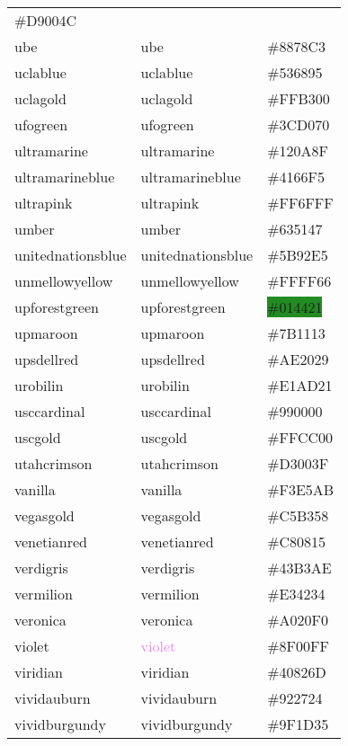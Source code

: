 \documentclass[
]{article}
\begin{document}
\begin{longtable}[]{@{}lll@{}}
\colorbox{uared}{\#D9004C}\tabularnewline
ube & \textcolor{ube}{ube} & \colorbox{ube}{\#8878C3}\tabularnewline
uclablue & \textcolor{uclablue}{uclablue} &
\colorbox{uclablue}{\#536895}\tabularnewline
uclagold & \textcolor{uclagold}{uclagold} &
\colorbox{uclagold}{\#FFB300}\tabularnewline
ufogreen & \textcolor{ufogreen}{ufogreen} &
\colorbox{ufogreen}{\#3CD070}\tabularnewline
ultramarine & \textcolor{ultramarine}{ultramarine} &
\colorbox{ultramarine}{\#120A8F}\tabularnewline
ultramarineblue & \textcolor{ultramarineblue}{ultramarineblue} &
\colorbox{ultramarineblue}{\#4166F5}\tabularnewline
ultrapink & \textcolor{ultrapink}{ultrapink} &
\colorbox{ultrapink}{\#FF6FFF}\tabularnewline
umber & \textcolor{umber}{umber} &
\colorbox{umber}{\#635147}\tabularnewline
unitednationsblue & \textcolor{unitednationsblue}{unitednationsblue} &
\colorbox{unitednationsblue}{\#5B92E5}\tabularnewline
unmellowyellow & \textcolor{unmellowyellow}{unmellowyellow} &
\colorbox{unmellowyellow}{\#FFFF66}\tabularnewline
upforestgreen & \textcolor{upforestgreen}{upforestgreen} &
\colorbox{forestgreen}{\#014421}\tabularnewline
upmaroon & \textcolor{upmaroon}{upmaroon} &
\colorbox{upmaroon}{\#7B1113}\tabularnewline
upsdellred & \textcolor{upsdellred}{upsdellred} &
\colorbox{upsdellred}{\#AE2029}\tabularnewline
urobilin & \textcolor{urobilin}{urobilin} &
\colorbox{urobilin}{\#E1AD21}\tabularnewline
usccardinal & \textcolor{usccardinal}{usccardinal} &
\colorbox{oucrimsonred}{\#990000}\tabularnewline
uscgold & \textcolor{uscgold}{uscgold} &
\colorbox{tangerineyellow}{\#FFCC00}\tabularnewline
utahcrimson & \textcolor{utahcrimson}{utahcrimson} &
\colorbox{utahcrimson}{\#D3003F}\tabularnewline
vanilla & \textcolor{vanilla}{vanilla} &
\colorbox{mediumchampagne}{\#F3E5AB}\tabularnewline
vegasgold & \textcolor{vegasgold}{vegasgold} &
\colorbox{vegasgold}{\#C5B358}\tabularnewline
venetianred & \textcolor{venetianred}{venetianred} &
\colorbox{venetianred}{\#C80815}\tabularnewline
verdigris & \textcolor{verdigris}{verdigris} &
\colorbox{verdigris}{\#43B3AE}\tabularnewline
vermilion & \textcolor{vermilion}{vermilion} &
\colorbox{cinnabar}{\#E34234}\tabularnewline
veronica & \textcolor{veronica}{veronica} &
\colorbox{veronica}{\#A020F0}\tabularnewline
violet & \textcolor{violet}{violet} &
\colorbox{electricviolet}{\#8F00FF}\tabularnewline
viridian & \textcolor{viridian}{viridian} &
\colorbox{viridian}{\#40826D}\tabularnewline
vividauburn & \textcolor{vividauburn}{vividauburn} &
\colorbox{vividauburn}{\#922724}\tabularnewline
vividburgundy & \textcolor{vividburgundy}{vividburgundy} &
\colorbox{vividburgundy}{\#9F1D35}\tabularnewline

\end{longtable}
\end{document}
